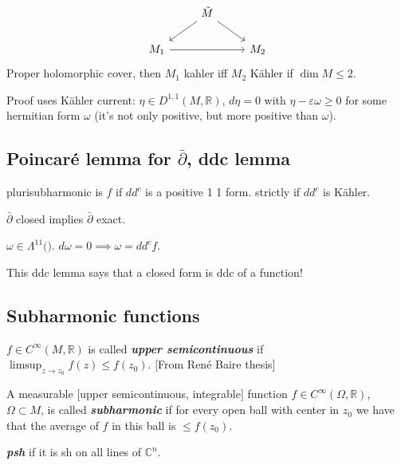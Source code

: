 \[\begin{tikzcd}
&\tilde{M}\arrow[dl,"",swap]\arrow[dr]\\
M_1\arrow[rr]&&M_2
\end{tikzcd}\]
Proper holomorphic cover, then \(M_1\) kahler iff \(M_2\) Kähler if \(\dim M \leq  2\).

Proof uses Kähler current: \(\eta \in D^{1,1}(M,\mathbb{R})\), \(d\eta=0\) with \(\eta- \varepsilon \omega \geq 0\) for some hermitian form \(\omega\) (it's not only positive, but more positive than \(\omega\)).

\subsection{Poincaré lemma for $\bar\partial$, ddc lemma}

\begin{defn}\leavevmode
plurisubharmonic is \(f\) if \(dd^c\) is a positive 1 1 form. strictly if  \(d d ^c\) is Kähler.
\end{defn}

\begin{lemma}\leavevmode
	\(\bar\partial\) closed implies \(\bar\partial\) exact.
\end{lemma}

\begin{coro}\leavevmode
\(\omega \in \Lambda^{ 11}(\Big).\) \(d\omega=0 \implies  \omega=d d ^c f\).
\end{coro}

This ddc lemma says that a closed form is ddc of a function!

\subsection{Subharmonic functions}

\begin{defn}\leavevmode
	\(f \in C^\infty(M,\mathbb{R})\) is called \textit{\textbf{upper semicontinuous}} if \(\operatorname{ l i m s u p}_{z \to z_0} f(z) \leq f(z_0) \). [From René Baire thesis]

A measurable [upper semicontinuous, integrable] function \(f \in C^\infty(\Omega,\mathbb{R})\), \(\Omega \subset M\), is called \textit{\textbf{subharmonic}} if for every open ball with center in \(z_0\) we have that the average of \(f\) in this ball is \(\leq f(z_0)\).

\textit{\textbf{psh}} if it is  sh on all lines of \(\mathbb{C}^n\).
\end{defn}

